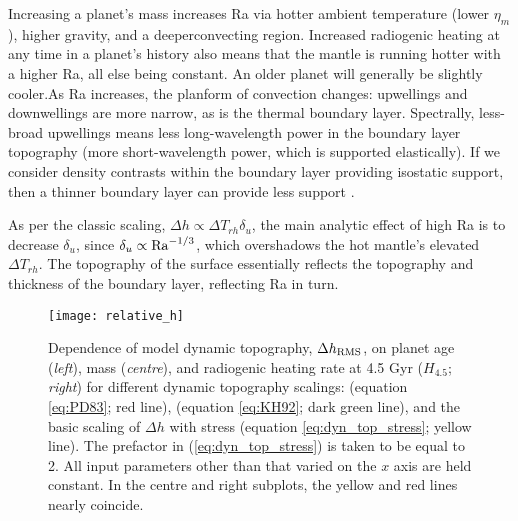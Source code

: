  Increasing a planet's mass increases Ra via hotter ambient temperature (lower $\eta_m$), higher gravity, and a deeperconvecting region. Increased radiogenic heating at any time in a planet's history also means that the mantle is running hotter with a higher Ra, all else being constant. An older planet will generally be slightly cooler.As Ra increases, the planform of convection changes: upwellings and downwellings are more narrow, as is the thermal boundary layer. Spectrally, less-broad upwellings means less long-wavelength power in the boundary layer topography (more short-wavelength power, which is supported elastically). If we consider density contrasts within the boundary layer providing isostatic support, then a thinner boundary layer can provide less support \citet{Kiefer1992}.
 
As per the classic scaling, $\Delta h \propto \Delta T_{rh} \delta_{u}$, the main analytic effect of high Ra is to decrease $\delta_{u}$, since $\delta_{u} \propto {\rm Ra}^{-1/3}$, which overshadows the hot mantle's elevated $\Delta T_{rh}$. The topography of the surface essentially reflects the topography and thickness of the boundary layer, reflecting Ra in turn.



\begin{figure}
  \centering
  \texttt{[image: relative\_h]}
\caption{Dependence of model dynamic topography, $\Delta h_{\rm RMS}$, on planet age (\textit{left}), mass (\textit{centre}), and radiogenic heating rate at 4.5 Gyr ($H_{4.5}$; \textit{right}) for different dynamic topography scalings: \citet{Parsons1983} (equation \ref{eq:PD83}; red line), \citet{Kiefer1992} (equation \ref{eq:KH92}; dark green line), and the basic scaling of $\Delta h$ with stress (equation \ref{eq:dyn_top_stress}; yellow line).  The prefactor in (\ref{eq:dyn_top_stress}) is taken to be equal to 2. All input parameters other than that varied on the $x$ axis are held constant. In the centre and right subplots, the yellow and red lines nearly coincide.}
\label{fig:RMS_v_planet}
\end{figure}



